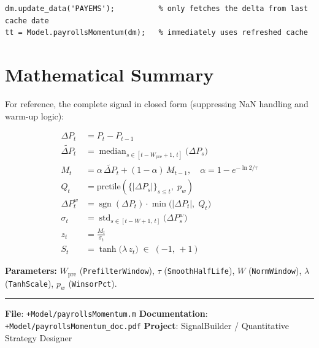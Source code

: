 \documentclass[11pt, a4paper]{article}
\DeclareMathOperator{\Med}{median}
\DeclareMathOperator{\std}{std}
\DeclareMathOperator{\sgn}{sgn}
\newcommand{\dP}{\Delta P}
\begin{document}
\begin{lstlisting}[style=matlab, caption={Incremental cache refresh}]
dm.update_data('PAYEMS');          % only fetches the delta from last cache date
tt = Model.payrollsMomentum(dm);   % immediately uses refreshed cache
\end{lstlisting}

\section{Mathematical Summary}
\label{sec:summary}

For reference, the complete signal in closed form (suppressing NaN
handling and warm-up logic):

\begin{align}
  \dP_t &= P_t - P_{t-1} \\[4pt]
  \tilde{\dP}_t &= \Med_{s \in [t-W_{\mathrm{pre}}+1,\,t]}\!\bigl(\dP_s\bigr) \\[4pt]
  M_t &= \alpha\,\tilde{\dP}_t + (1-\alpha)\,M_{t-1},
    \quad \alpha = 1 - e^{-\ln2/\tau} \\[4pt]
  Q_t &= \text{prctile}\!\left(\bigl\{|\dP_s|\bigr\}_{s \leq t},\; p_w\right) \\[4pt]
  \dP^w_t &= \sgn(\dP_t)\cdot\min\!\bigl(|\dP_t|,\;Q_t\bigr) \\[4pt]
  \sigma_t &= \std_{s \in [t-W+1,\,t]}\!\bigl(\dP^w_s\bigr) \\[4pt]
  z_t &= \frac{M_t}{\sigma_t} \\[6pt]
  S_t &= \tanh\!\bigl(\lambda\,z_t\bigr) \;\in\; (-1,\,+1)
\end{align}

\textbf{Parameters:}
$W_{\mathrm{pre}}$ (\texttt{PrefilterWindow}),
$\tau$ (\texttt{SmoothHalfLife}),
$W$ (\texttt{NormWindow}),
$\lambda$ (\texttt{TanhScale}),
$p_w$ (\texttt{WinsorPct}).

\vfill
\hrule
\vspace{6pt}
{\small\color{gray}
\textbf{File}: \texttt{+Model/payrollsMomentum.m} \quad
\textbf{Documentation}: \texttt{+Model/payrollsMomentum\_doc.pdf} \quad
\textbf{Project}: SignalBuilder / Quantitative Strategy Designer
}
\end{document}
